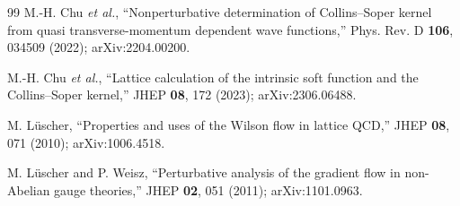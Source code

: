 \documentclass[UTF8]{ctexart}
\begin{document}
\begin{thebibliography}{99}
M.-H. Chu \textit{et al.},
\newblock ``Nonperturbative determination of Collins--Soper kernel from quasi transverse-momentum dependent wave functions,''
\newblock Phys. Rev. D \textbf{106}, 034509 (2022); arXiv:2204.00200.

M.-H. Chu \textit{et al.},
\newblock ``Lattice calculation of the intrinsic soft function and the Collins--Soper kernel,''
\newblock JHEP \textbf{08}, 172 (2023); arXiv:2306.06488.

M. Lüscher,
\newblock ``Properties and uses of the Wilson flow in lattice QCD,''
\newblock JHEP \textbf{08}, 071 (2010); arXiv:1006.4518.

M. Lüscher and P. Weisz,
\newblock ``Perturbative analysis of the gradient flow in non-Abelian gauge theories,''
\newblock JHEP \textbf{02}, 051 (2011); arXiv:1101.0963.

\end{thebibliography}
\end{document}
